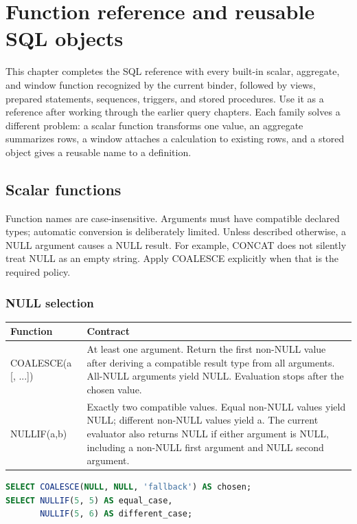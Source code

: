 \chapter{Function reference and reusable SQL objects}
\label{sql:advanced}

This chapter completes the SQL reference with every built-in scalar, aggregate, and window function recognized by the current binder, followed by views, prepared statements, sequences, triggers, and stored procedures. Use it as a reference after working through the earlier query chapters. Each family solves a different problem: a scalar function transforms one value, an aggregate summarizes rows, a window attaches a calculation to existing rows, and a stored object gives a reusable name to a definition.

\section{Scalar functions}
\label{sql:scalar-functions}

Function names are case-insensitive. Arguments must have compatible declared types; automatic conversion is deliberately limited. Unless described otherwise, a NULL argument causes a NULL result. For example, CONCAT does not silently treat NULL as an empty string. Apply COALESCE explicitly when that is the required policy.

\subsection{NULL selection}

\begin{longtable}{p{.30\linewidth}p{.63\linewidth}}
\toprule
Function & Contract \\
\midrule
\endhead
COALESCE(a [, ...]) & At least one argument. Return the first non-NULL value after deriving a compatible result type from all arguments. All-NULL arguments yield NULL. Evaluation stops after the chosen value. \\
NULLIF(a,b) & Exactly two compatible values. Equal non-NULL values yield NULL; different non-NULL values yield a. The current evaluator also returns NULL if either argument is NULL, including a non-NULL first argument and NULL second argument. \\
\bottomrule
\end{longtable}

\begin{lstlisting}[language=SQL]
SELECT COALESCE(NULL, NULL, 'fallback') AS chosen;
SELECT NULLIF(5, 5) AS equal_case,
       NULLIF(5, 6) AS different_case;
\end{lstlisting}

